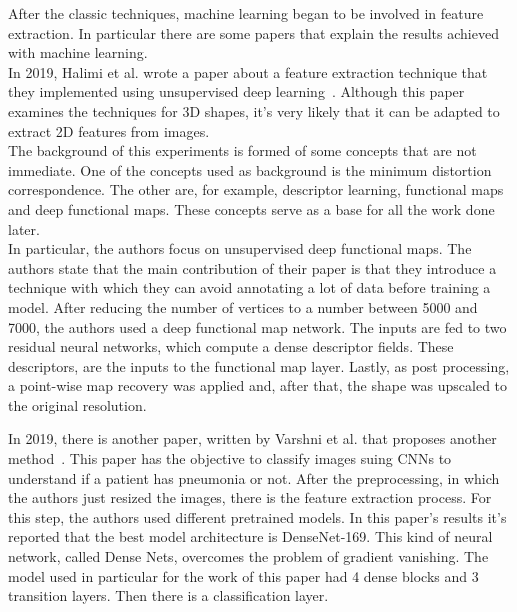 \documentclass[conference]{IEEEtran}
\begin{document}
				After the classic techniques, machine learning began to be involved in feature extraction. In particular there are some papers that explain the results achieved with machine learning.\\
				In 2019, Halimi et al. wrote a paper about a feature extraction technique that they implemented using unsupervised deep learning~\cite{halimi2019unsupervised}. Although this paper examines the techniques for 
				3D shapes, it's very likely that it can be adapted to extract 2D features from images.\\
				The background of this experiments is formed of some concepts that are not immediate. One of the concepts used as background is the minimum distortion correspondence. The other are, for example, 
				descriptor learning, functional maps and deep functional maps. These concepts serve as a base for all the work done later. \\
				In particular, the authors focus on unsupervised deep functional maps. The authors state that the main contribution of their paper is that they introduce a technique with which they can 
				avoid annotating a lot of data before training a model. After reducing the number of vertices to a number between 5000 and 7000, the authors used a deep functional map network. The inputs are 
				fed to two residual neural networks, which compute a dense descriptor fields. These descriptors, are the inputs to the functional map layer. Lastly, as post processing, a point-wise map recovery was 
				applied and, after that, the shape was upscaled to the original resolution. 
				
				\noindent In 2019, there is another paper, written by Varshni et al. that proposes another method~\cite{varshni2019pneumonia}. This paper has the objective to classify images suing CNNs to understand if a patient 
				has pneumonia or not. After the preprocessing, in which the authors just resized the images, there is the feature extraction process. For this step, the authors used different pretrained models.
				In this paper's results it's reported that the best model architecture is DenseNet-169. This kind of neural network, called Dense Nets, overcomes the problem of gradient vanishing. The model used in 
				particular for the work of this paper had 4 dense blocks and 3 transition layers. Then there is a classification layer. 
				
\end{document}

